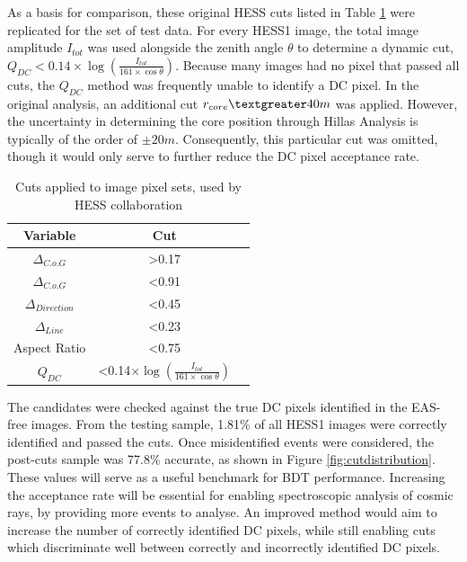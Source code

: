 \documentclass[11pt]{article}
\begin{document}
As a basis for comparison, these original HESS cuts listed in Table \ref{tab:qdccuts} were replicated for the set of test data. For every HESS1 image, the total image amplitude $I_{tot}$ was used alongside the zenith angle $\theta$ to determine a dynamic cut, $Q_{DC} < 0.14 \times \log(\frac{I_{tot}}{161 \times \cos \theta})$. Because many images had no pixel that passed all cuts, the $Q_{DC}$ method was frequently unable to identify a DC pixel. In the original analysis, an additional cut $r_{core} \textgreater 40m$ was applied. However, the uncertainty in determining the core position through Hillas Analysis is typically of the order of $\pm 20m$. Consequently, this particular cut was omitted, though it would only serve to further reduce the DC pixel acceptance rate.

\begin{table}[h!]
  \centering
  \caption{Cuts applied to image pixel sets, used by HESS collaboration \cite{hess07}}
  \label{tab:qdccuts}
  \begin{tabular}{ccc}
    \toprule
    Variable & Cut\\
    \midrule
     $ \Delta_{C.o.G}$ & \textgreater 0.17 \\
     $ \Delta_{C.o.G}$ & \textless 0.91 \\
     $\Delta_{Direction}$ & \textless 0.45 \\
     $\Delta_{Line}$ & \textless 0.23 \\
     Aspect Ratio & \textless 0.75 \\
     $Q_{DC}$ & \textless 0.14$ \times \log(\frac{I_{tot}}{161 \times \cos \theta})$ \\
    \bottomrule
  \end{tabular}
\end{table}

The candidates were checked against the true DC pixels identified in the EAS-free images. From the testing sample, 1.81\% of all HESS1 images were correctly identified and passed the cuts. Once misidentified events were considered, the post-cuts sample was 77.8\% accurate, as shown in Figure \ref{fig:cutdistribution}. These values will serve as a useful benchmark for BDT performance. Increasing the acceptance rate will be essential for enabling spectroscopic analysis of cosmic rays, by providing more events to analyse. An improved method would aim to increase the number of correctly identified DC pixels, while still enabling cuts which discriminate well between correctly and incorrectly identified DC pixels.
\end{document}

